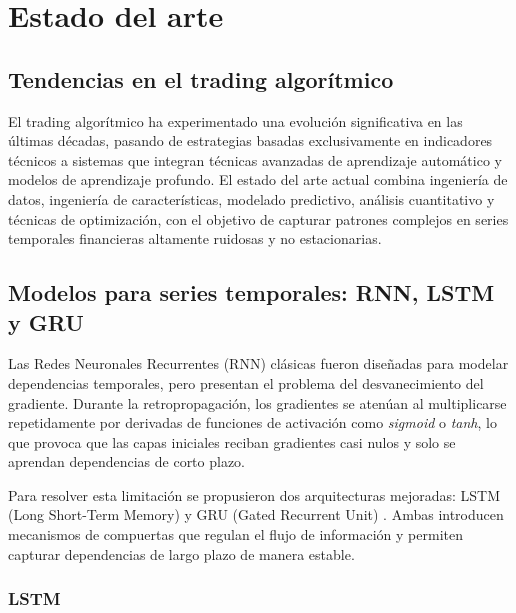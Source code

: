 \setlength{\parindent}{0em}

\chapter{Estado del arte}\label{cap2}\thispagestyle{fancy}

\vspace{-1.3cm}

\section{Tendencias en el trading algorítmico}

El trading algorítmico ha experimentado una evolución significativa en las últimas décadas, pasando de estrategias basadas exclusivamente en
indicadores técnicos a sistemas que integran técnicas avanzadas de aprendizaje automático y modelos de aprendizaje profundo. El estado del arte actual
combina ingeniería de datos, ingeniería de características, modelado predictivo, análisis cuantitativo y técnicas de optimización, con el objetivo de
capturar patrones complejos en series temporales financieras altamente ruidosas y no estacionarias.

\section{Modelos para series temporales: RNN, LSTM y GRU}

Las Redes Neuronales Recurrentes (RNN) clásicas \cite{elman1990rnn} fueron diseñadas para modelar dependencias temporales, pero presentan el problema
del desvanecimiento del gradiente. Durante la retropropagación, los gradientes se atenúan al multiplicarse repetidamente por derivadas de funciones de
activación como \textit{sigmoid} o \textit{tanh}, lo que provoca que las capas iniciales reciban gradientes casi nulos y solo se aprendan dependencias
de corto plazo.

Para resolver esta limitación se propusieron dos arquitecturas mejoradas: LSTM (Long Short-Term Memory) \cite{hochreiter1997lstm} y GRU (Gated
Recurrent Unit) \cite{cho2014gru}. Ambas introducen mecanismos de compuertas que regulan el flujo de información y permiten capturar dependencias de
largo plazo de manera estable.

\subsection{LSTM}

